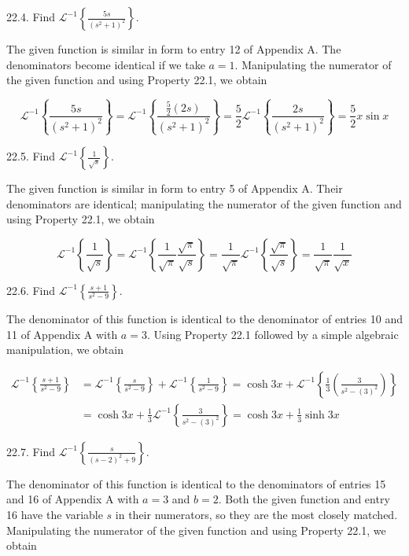 \documentclass[10pt]{article}
\begin{document}
22.4. Find $\mathscr{L}^{-1}\left\{\frac{5 s}{\left(s^{2}+1\right)^{2}}\right\}$.

The given function is similar in form to entry 12 of Appendix A. The denominators become identical if we take $a=1$. Manipulating the numerator of the given function and using Property 22.1, we obtain

$$
\mathscr{L}^{-1}\left\{\frac{5 s}{\left(s^{2}+1\right)^{2}}\right\}=\mathscr{L}^{-1}\left\{\frac{\frac{5}{2}(2 s)}{\left(s^{2}+1\right)^{2}}\right\}=\frac{5}{2} \mathscr{L}^{-1}\left\{\frac{2 s}{\left(s^{2}+1\right)^{2}}\right\}=\frac{5}{2} x \sin x
$$

22.5. Find $\mathscr{L}^{-1}\left\{\frac{1}{\sqrt{s}}\right\}$.

The given function is similar in form to entry 5 of Appendix A. Their denominators are identical; manipulating the numerator of the given function and using Property 22.1, we obtain

$$
\mathscr{L}^{-1}\left\{\frac{1}{\sqrt{s}}\right\}=\mathscr{L}^{-1}\left\{\frac{1}{\sqrt{\pi}} \frac{\sqrt{\pi}}{\sqrt{s}}\right\}=\frac{1}{\sqrt{\pi}} \mathscr{L}^{-1}\left\{\frac{\sqrt{\pi}}{\sqrt{s}}\right\}=\frac{1}{\sqrt{\pi}} \frac{1}{\sqrt{x}}
$$

22.6. Find $\mathscr{L}^{-1}\left\{\frac{s+1}{s^{2}-9}\right\}$.

The denominator of this function is identical to the denominator of entries 10 and 11 of Appendix A with $a=3$. Using Property 22.1 followed by a simple algebraic manipulation, we obtain

$$
\begin{aligned}
\mathscr{L}^{-1}\left\{\frac{s+1}{s^{2}-9}\right\} & =\mathscr{L}^{-1}\left\{\frac{s}{s^{2}-9}\right\}+\mathscr{L}^{-1}\left\{\frac{1}{s^{2}-9}\right\}=\cosh 3 x+\mathscr{L}^{-1}\left\{\frac{1}{3}\left(\frac{3}{s^{2}-(3)^{2}}\right)\right\} \\
& =\cosh 3 x+\frac{1}{3} \mathscr{L}^{-1}\left\{\frac{3}{s^{2}-(3)^{2}}\right\}=\cosh 3 x+\frac{1}{3} \sinh 3 x
\end{aligned}
$$

22.7. Find $\mathscr{L}^{-1}\left\{\frac{s}{(s-2)^{2}+9}\right\}$.

The denominator of this function is identical to the denominators of entries 15 and 16 of Appendix A with $a=3$ and $b=2$. Both the given function and entry 16 have the variable $s$ in their numerators, so they are the most closely matched. Manipulating the numerator of the given function and using Property 22.1, we obtain
\end{document}
